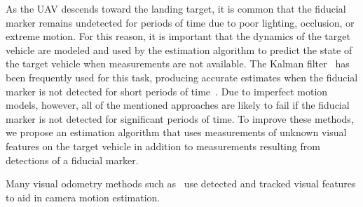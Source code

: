 As the UAV descends toward the landing target, it is common
that the fiducial marker remains undetected
for periods of time due to poor lighting, occlusion, or extreme
motion.
For this reason, it is important that the dynamics of the target vehicle are
modeled and
used by the estimation algorithm to predict the state of the target vehicle
when measurements are not available.
The Kalman filter~\cite{kalman} has been frequently used
for this task, producing accurate estimates 
when the fiducial marker is not detected for
short periods of time~\cite{baca2019autonomous}.
Due to imperfect motion models, however,
all of the mentioned
approaches are likely to fail if the fiducial marker is not detected for
significant periods of time.
To improve these methods, we propose an estimation algorithm that uses
measurements of unknown visual features on the target vehicle in addition to
measurements resulting from detections of a fiducial marker.

Many visual odometry methods such
as~\cite{qin2018vins,leutenegger2013keyframe,mourikis2007multi,mur2015orb,wang2018ego} use
detected and tracked visual features to aid in camera motion estimation.

